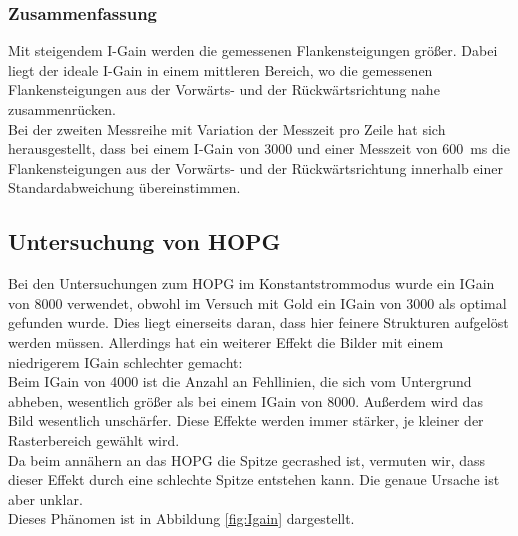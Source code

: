 \documentclass[12pt,a4paper]{article}
\begin{document}
\subsubsection{Zusammenfassung}
Mit steigendem I-Gain werden die gemessenen Flankensteigungen größer. Dabei liegt der ideale I-Gain in einem mittleren Bereich, wo die gemessenen Flankensteigungen aus der Vorwärts- und der Rückwärtsrichtung nahe zusammenrücken. \\
Bei der zweiten Messreihe mit Variation der Messzeit pro Zeile hat sich herausgestellt, dass bei einem I-Gain von 3000 und einer Messzeit von \SI{600}{ms} die Flankensteigungen aus der Vorwärts- und der Rückwärtsrichtung innerhalb einer Standardabweichung übereinstimmen.
\newpage
\subsection{Untersuchung von HOPG}
Bei den Untersuchungen zum HOPG im Konstantstrommodus wurde ein IGain von 8000 verwendet, obwohl im Versuch mit Gold ein IGain von 3000 als optimal gefunden wurde. Dies liegt einerseits daran, dass hier feinere Strukturen aufgelöst werden müssen. Allerdings hat ein weiterer Effekt die Bilder mit einem niedrigerem IGain schlechter gemacht:\\
Beim IGain von 4000 ist die Anzahl an Fehllinien, die sich vom Untergrund abheben, wesentlich größer als bei einem IGain von 8000. Außerdem wird das Bild wesentlich unschärfer. Diese Effekte werden immer stärker, je kleiner der Rasterbereich gewählt wird.\\
Da beim annähern an das HOPG die Spitze gecrashed ist, vermuten wir, dass dieser Effekt durch eine schlechte Spitze entstehen kann. Die genaue Ursache ist aber unklar.\\
Dieses Phänomen ist in Abbildung \ref{fig:Igain} dargestellt.
\end{document}
